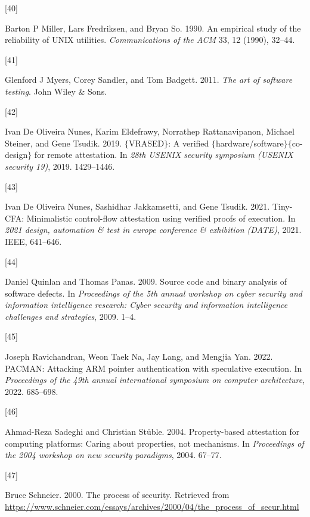 \documentclass[a4paper, nobind]{templates/ociamthesis}
\newlength{\cslhangindent}
\newlength{\csllabelwidth}
\newenvironment{CSLReferences}[2] %
{\begin{list}{}{%
	\setlength{\itemindent}{0pt}
	\setlength{\leftmargin}{0pt}
	\setlength{\parsep}{0pt}
	\ifodd #1
	\setlength{\leftmargin}{\cslhangindent}
	\setlength{\itemindent}{-1\cslhangindent}
	\fi
	\setlength{\itemsep}{#2\baselineskip}}}
{\end{list}}
\newcommand{\CSLLeftMargin}[1]{\parbox[t]{\csllabelwidth}{\strut#1\strut}}
\newcommand{\CSLRightInline}[1]{\parbox[t]{\linewidth - \csllabelwidth}{\strut#1\strut}}
\begin{document}
\begin{CSLReferences}{0}{0}
\CSLLeftMargin{{[}40{]} }%
\CSLRightInline{Barton P Miller, Lars Fredriksen, and Bryan So. 1990. An empirical study of the reliability of UNIX utilities. \emph{Communications of the ACM} 33, 12 (1990), 32--44.}

\CSLLeftMargin{{[}41{]} }%
\CSLRightInline{Glenford J Myers, Corey Sandler, and Tom Badgett. 2011. \emph{The art of software testing}. John Wiley \& Sons.}

\CSLLeftMargin{{[}42{]} }%
\CSLRightInline{Ivan De Oliveira Nunes, Karim Eldefrawy, Norrathep Rattanavipanon, Michael Steiner, and Gene Tsudik. 2019. \(\{\)VRASED\(\}\): A verified \(\{\)hardware/software\(\}\)\(\{\)co-design\(\}\) for remote attestation. In \emph{28th USENIX security symposium (USENIX security 19)}, 2019. 1429--1446.}

\CSLLeftMargin{{[}43{]} }%
\CSLRightInline{Ivan De Oliveira Nunes, Sashidhar Jakkamsetti, and Gene Tsudik. 2021. Tiny-CFA: Minimalistic control-flow attestation using verified proofs of execution. In \emph{2021 design, automation \& test in europe conference \& exhibition (DATE)}, 2021. IEEE, 641--646.}

\CSLLeftMargin{{[}44{]} }%
\CSLRightInline{Daniel Quinlan and Thomas Panas. 2009. Source code and binary analysis of software defects. In \emph{Proceedings of the 5th annual workshop on cyber security and information intelligence research: Cyber security and information intelligence challenges and strategies}, 2009. 1--4.}

\CSLLeftMargin{{[}45{]} }%
\CSLRightInline{Joseph Ravichandran, Weon Taek Na, Jay Lang, and Mengjia Yan. 2022. PACMAN: Attacking ARM pointer authentication with speculative execution. In \emph{Proceedings of the 49th annual international symposium on computer architecture}, 2022. 685--698.}

\CSLLeftMargin{{[}46{]} }%
\CSLRightInline{Ahmad-Reza Sadeghi and Christian Stüble. 2004. Property-based attestation for computing platforms: Caring about properties, not mechanisms. In \emph{Proceedings of the 2004 workshop on new security paradigms}, 2004. 67--77.}

\CSLLeftMargin{{[}47{]} }%
\CSLRightInline{Bruce Schneier. 2000. The process of security. Retrieved from \url{https://www.schneier.com/essays/archives/2000/04/the_process_of_secur.html}}


\end{CSLReferences}
\end{document}
